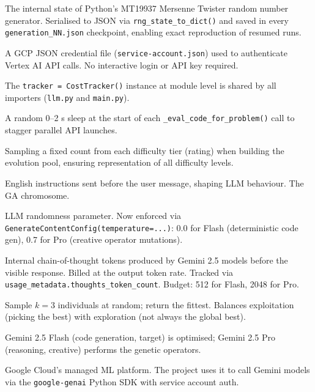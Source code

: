 \documentclass[11pt,a4paper]{report}
\newcommand{\fn}[1]{\texttt{#1}}
\newcommand{\pyf}[1]{\texttt{#1}}
\begin{document}
\begin{description}[style=nextline, leftmargin=3cm, itemsep=2pt]
\item[RNG state] The internal state of Python's MT19937 Mersenne Twister random number
  generator.  Serialised to JSON via \fn{rng\_state\_to\_dict()} and saved in every
  \fn{generation\_NN.json} checkpoint, enabling exact reproduction of resumed runs.

\item[Service account] A GCP JSON credential file (\fn{service-account.json}) used to
  authenticate Vertex AI API calls.  No interactive login or API key required.

\item[Singleton] The \fn{tracker = CostTracker()} instance at module level is shared
  by all importers (\pyf{llm.py} and \pyf{main.py}).

\item[Startup jitter] A random 0--2 s sleep at the start of each
  \fn{\_eval\_code\_for\_problem()} call to stagger parallel API launches.

\item[Stratified split] Sampling a fixed count from each difficulty tier (rating) when
  building the evolution pool, ensuring representation of all difficulty levels.

\item[System prompt] English instructions sent before the user message, shaping LLM
  behaviour.  The GA chromosome.

\item[Temperature] LLM randomness parameter.  Now enforced via
  \fn{GenerateContentConfig(temperature=...)}: 0.0 for Flash (deterministic code gen),
  0.7 for Pro (creative operator mutations).

\item[Thinking tokens] Internal chain-of-thought tokens produced by Gemini 2.5 models
  before the visible response.  Billed at the output token rate.  Tracked via
  \fn{usage\_metadata.thoughts\_token\_count}.  Budget: 512 for Flash, 2048 for Pro.

\item[Tournament selection] Sample $k=3$ individuals at random; return the fittest.
  Balances exploitation (picking the best) with exploration (not always the global best).

\item[Two-model architecture] Gemini 2.5 Flash (code generation, target) is optimised;
  Gemini 2.5 Pro (reasoning, creative) performs the genetic operators.

\item[Vertex AI] Google Cloud's managed ML platform.  The project uses it to call
  Gemini models via the \fn{google-genai} Python SDK with service account auth.

\end{description}
\end{document}
